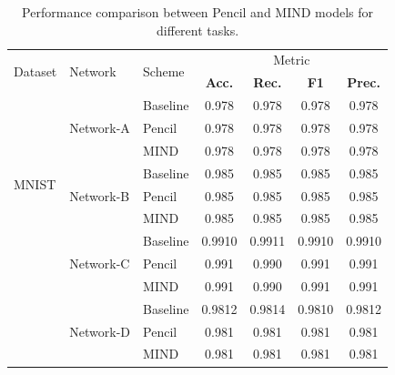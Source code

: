 \documentclass[conference]{IEEEtran}
\begin{document}
\begin{table}[ht]
\centering
\caption{Performance comparison between Pencil and MIND models for different tasks.}
\begin{tabular}{ l|l|l | c c c c } 
\hline
\multirow{2}{*}{Dataset} & \multirow{2}{*}{Network} & \multirow{2}{*}{Scheme} & \multicolumn{4}{c}{Metric} \\ 
\cline{4-7}
                      &                        &                        & \textbf{Acc.} & \textbf{Rec.} & \textbf{F1} & \textbf{Prec.} \\ 
\hline
\multirow{8}{*}{MNIST}   & \multirow{3}{*}{Network-A}  
                         & Baseline & 0.978 & 0.978 & 0.978 & 0.978 \\ 
                         &           & Pencil & 0.978 & 0.978 & 0.978 & 0.978 \\ 
                         &            & MIND    & 0.978 & 0.978 & 0.978 & 0.978 \\ 
\cline{2-7}
                      & \multirow{3}{*}{Network-B}
                      & Baseline & 0.985 & 0.985 & 0.985 & 0.985 \\
                      &           & Pencil & 0.985 & 0.985 & 0.985 & 0.985 \\ 
                      &            & MIND    & 0.985 & 0.985 & 0.985 & 0.985 \\ 
\cline{2-7}
                      & \multirow{3}{*}{Network-C}    
                      & Baseline & 0.9910 & 0.9911 & 0.9910 & 0.9910 \\
                      &          & Pencil & 0.991 & 0.990 & 0.991 & 0.991 \\ 
                      &            & MIND    & 0.991 & 0.990 & 0.991 & 0.991 \\ 
\cline{2-7}
                      & \multirow{3}{*}{Network-D}
                      & Baseline & 0.9812 & 0.9814 & 0.9810 & 0.9812 \\
                      &         & Pencil & 0.981 & 0.981 & 0.981 & 0.981 \\ 
                      &            & MIND    & 0.981 & 0.981 & 0.981 & 0.981 \\ 
\hline
                    

\end{tabular}
\end{table}
\end{document}
